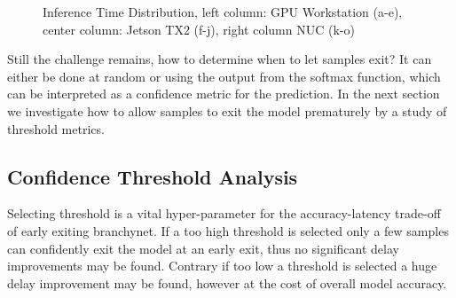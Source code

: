 \begin{figure}
\begin{minipage}{.33\textwidth}
		\hfill
		\hfill
	\end{minipage}
	\caption[Platform Inference Time of \gls{dnn}s]{Inference Time Distribution, left column: GPU Workstation (a-e), center column: Jetson TX2 (f-j), right column NUC (k-o)}
	\label{fig:inference-time-dist}
\end{figure}

Still the challenge remains, how to determine when to let samples exit? It can either be done at random or using the output from the softmax function, which can be interpreted as a confidence metric for the prediction. In the next section we investigate how to allow samples to exit the model prematurely by a study of threshold metrics.


\subsection{Confidence Threshold Analysis}

Selecting threshold is a vital hyper-parameter for the accuracy-latency trade-off of early exiting \gls{branchynet}. If a too high threshold is selected only a few samples can confidently exit the model at an early exit, thus no significant delay improvements may be found. Contrary if too low a threshold is selected a huge delay improvement may be found, however at the cost of overall model accuracy. 

